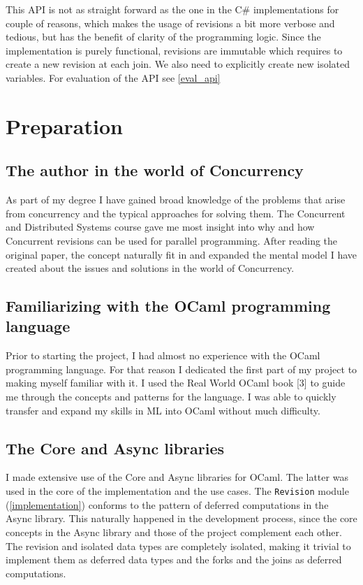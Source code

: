\documentclass[12pt,twoside,notitlepage]{report}
\begin{document}
This API is not as straight forward as the one in the C\# implementations for couple of reasons, which makes the usage of revisions a bit more verbose and tedious, but has the benefit of clarity of the programming logic. Since the implementation is purely functional, revisions are immutable which requires to create a new revision at each join. We also need to explicitly create new isolated variables. For evaluation of the API see \ref{eval_api} 




\cleardoublepage



\chapter{Preparation}
\section{The author in the world of Concurrency}
As part of my degree I have gained broad knowledge of the problems that arise from concurrency and the typical approaches for solving them. The Concurrent and Distributed Systems course gave me most insight into why and how Concurrent revisions can be used for parallel programming. After reading the original paper, the concept naturally fit in and expanded the mental model I have created about the issues and solutions in the world of Concurrency.  

\section{Familiarizing with the OCaml programming language}
Prior to starting the project, I had almost no experience with the OCaml programming language. For that reason I dedicated the first part of my project to making myself familiar with it. I used the Real World OCaml book [3] to guide me through the concepts and patterns for the language. I was able to quickly transfer and expand my skills in ML into OCaml without much difficulty.

\section{The Core and Async libraries}
I made extensive use of the Core and Async libraries for OCaml. The latter was used in the core of the implementation and the use cases. The {\tt Revision} module (\ref{implementation}) conforms to the pattern of deferred computations in the Async library. This naturally happened in the development process, since the core concepts in the Async library and those of the project complement each other. The revision and isolated data types are completely isolated, making it trivial to implement them as deferred data types and the forks and the joins as deferred computations.  
\end{document}
